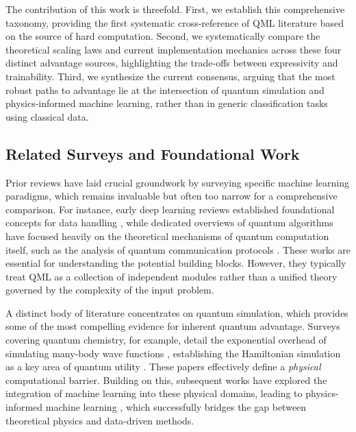 \documentclass{article}
\begin{document}
The contribution of this work is threefold. First, we establish this comprehensive taxonomy, providing the first systematic cross-reference of QML literature based on the source of hard computation. Second, we systematically compare the theoretical scaling laws and current implementation mechanics across these four distinct advantage sources, highlighting the trade-offs between expressivity and trainability. Third, we synthesize the current consensus, arguing that the most robust paths to advantage lie at the intersection of quantum simulation and physics-informed machine learning, rather than in generic classification tasks using classical data.

\subsection{Related Surveys and Foundational Work}

\label{sec:related\_surveys\_and\_foundational\_work}

Prior reviews have laid crucial groundwork by surveying specific machine learning paradigms, which remains invaluable but often too narrow for a comprehensive comparison. For instance, early deep learning reviews established foundational concepts for data handling \cite{alzubaidi2021review}, while dedicated overviews of quantum algorithms have focused heavily on the theoretical mechanisms of quantum computation itself, such as the analysis of quantum communication protocols \cite{gilboa2023exponential}. These works are essential for understanding the potential building blocks. However, they typically treat QML as a collection of independent modules rather than a unified theory governed by the complexity of the input problem.

A distinct body of literature concentrates on quantum simulation, which provides some of the most compelling evidence for inherent quantum advantage. Surveys covering quantum chemistry, for example, detail the exponential overhead of simulating many-body wave functions \cite{barca2020recent}, establishing the Hamiltonian simulation as a key area of quantum utility \cite{altman2021quantum}. These papers effectively define a \textit{physical} computational barrier. Building on this, subsequent works have explored the integration of machine learning into these physical domains, leading to physics-informed machine learning \cite{karniadakis2021physicsinformed}, which successfully bridges the gap between theoretical physics and data-driven methods.
\end{document}
